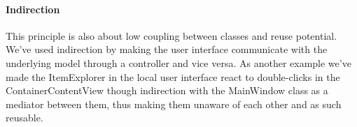 \paragraph{Indirection}
This principle is also about low coupling between classes and reuse potential. We've used indirection by making the user interface communicate with the underlying model through a controller and vice versa. As another example we've made the ItemExplorer in the local user interface react to double-clicks in the ContainerContentView though indirection with the MainWindow class as a mediator between them, thus making them unaware of each other and as such reusable.
